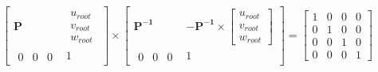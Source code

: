\documentclass[12pt]{article}
\begin{document}
    \[
        \left[ \begin{array}{cc}
            \textbf{P} & \begin{array}{c} u_{root} \\ v_{root} \\ w_{root} \end{array} \\
            \begin{array}{ccc} 0 & 0 & 0 \end{array} & 1
        \end{array} \right]
        \times
        \left[ \begin{array}{cc}
            \bm{P^{-1}} &
            -\bm{P^{-1}} \times
            \left[ \begin{array}{c}
                u_{root} \\ v_{root} \\ w_{root}
            \end{array} \right] \\
            \begin{array}{ccc} 0 & 0 & 0 \end{array} &
            1
        \end{array} \right]
        =
        \left[ \begin{array}{cccc}
            1 & 0 & 0 & 0 \\
            0 & 1 & 0 & 0 \\
            0 & 0 & 1 & 0 \\
            0 & 0 & 0 & 1
        \end{array} \right]
    \]
\end{document}
